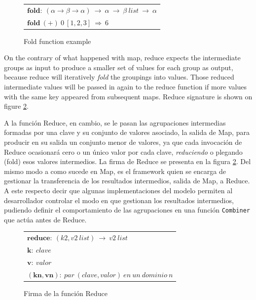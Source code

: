 \begin{figure}[tbp]
\begin{center}
\begin{tabular}{|l|}
\hline
$\mathbf{fold:} \: \left( \alpha \rightarrow \beta \rightarrow \alpha \right) \: \rightarrow \: \alpha \: \rightarrow \: \beta \: list \: \rightarrow \: \alpha$ \\
$\mathbf{fold} \: \left( \mathbf{+} \right) \: 0 \: \left[ 1,2,3 \right] \: \Rightarrow \: 6$ \\
\hline
\end{tabular}
\caption{Fold function example}
\label{fig:fold}
\end{center}
\end{figure}

On the contrary of what happened with map, reduce expects the intermediate groups as input to produce a smaller set of values for each group as output, because reduce will iteratively \emph{fold} the groupings into values. Those reduced intermediate values will be passed in again to the reduce function if more values with the same key appeared from subsequent maps. Reduce signature is shown on figure \ref{fig:reduce}.


A la funci\'on Reduce, en cambio, se le pasan las agrupaciones intermedias formadas por una clave y su conjunto de valores asociado, la salida de Map, para producir en su salida un conjunto menor de valores, ya que cada invocaci\'on de Reduce ocasionar\'a cero o un \'unico valor por cada clave, \emph{reduciendo} o plegando (fold) esos valores intermedios. La firma de Reduce se presenta en la figura \ref{fig:reduce}. Del mismo modo a como sucede en Map, es el framework quien se encarga de gestionar la transferencia de los resultados intermedios, salida de Map, a Reduce. A este respecto decir que algunas implementaciones del modelo permiten al desarrollador controlar el modo en que gestionan los resultados intermedios, pudiendo definir el comportamiento de las agrupaciones en una funci\'on \texttt{Combiner} que act\'ua antes de Reduce.

\begin{figure}[tbp]
\begin{center}
\begin{tabular}{|l|}
\hline
$\mathbf{reduce:} \: \left( k2,v2 \: list \right) \: \rightarrow \: v2 \: list$ \\
$\mathbf{k:} \: clave$ \\
$\mathbf{v:} \: valor$ \\
$\mathbf{\left(kn,vn \right):} \: par \: \left(clave,valor\right) \: en \: un \: dominio \: n$ \\
\hline
\end{tabular}
\caption{Firma de la funci\'on Reduce}
\label{fig:reduce}
\end{center}
\end{figure}


